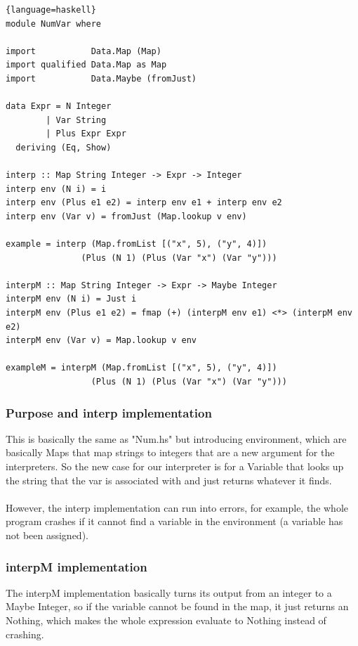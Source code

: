 \documentclass[12pt]{article}
\begin{document}
\begin{lstlisting}{language=haskell}
module NumVar where

import           Data.Map (Map)
import qualified Data.Map as Map
import           Data.Maybe (fromJust)

data Expr = N Integer
        | Var String
        | Plus Expr Expr
  deriving (Eq, Show)

interp :: Map String Integer -> Expr -> Integer
interp env (N i) = i
interp env (Plus e1 e2) = interp env e1 + interp env e2
interp env (Var v) = fromJust (Map.lookup v env)

example = interp (Map.fromList [("x", 5), ("y", 4)])
               (Plus (N 1) (Plus (Var "x") (Var "y")))

interpM :: Map String Integer -> Expr -> Maybe Integer
interpM env (N i) = Just i
interpM env (Plus e1 e2) = fmap (+) (interpM env e1) <*> (interpM env e2)
interpM env (Var v) = Map.lookup v env

exampleM = interpM (Map.fromList [("x", 5), ("y", 4)])
                 (Plus (N 1) (Plus (Var "x") (Var "y")))
\end{lstlisting}

\subsubsection{Purpose and interp implementation}

This is basically the same as "Num.hs" but introducing environment, which are basically Maps that map strings to integers that are a new argument for the interpreters. So the new case for our interpreter is for a Variable that looks up the string that the var is associated with and just returns whatever it finds.\\
\\
However, the interp implementation can run into errors, for example, the whole program crashes if it cannot find a variable in the environment (a variable has not been assigned).

\subsubsection{interpM implementation}

The interpM implementation basically turns its output from an integer to a Maybe Integer, so if the variable cannot be found in the map, it just returns an Nothing, which makes the whole expression evaluate to Nothing instead of crashing.
\end{document}

